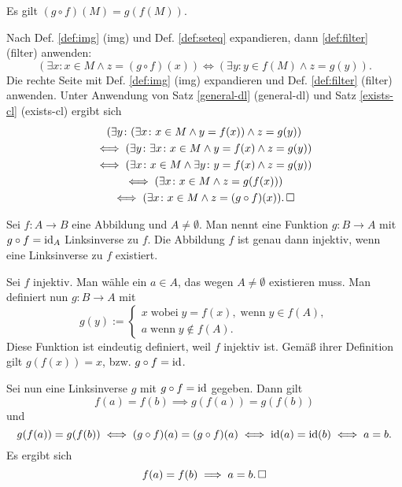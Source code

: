 \begin{Satz}\label{img-chain}
Es gilt $(g\circ f)(M) = g(f(M))$.
\end{Satz}
\begin{Beweis}
Nach Def. \ref{def:img} (img) und Def. \ref{def:seteq} expandieren,
dann \ref{def:filter} (filter) anwenden:%
\[(\exists x\colon x\in M\land z=(g\circ f)(x))
\iff (\exists y\colon y\in f(M)\land z=g(y)).\]
Die rechte Seite mit Def. \ref{def:img} (img) expandieren und
Def. \ref{def:filter} (filter) anwenden. Unter Anwendung von
Satz \ref{general-dl} (general-dl) und Satz \ref{exists-cl} (exists-cl)
ergibt sich%
\begin{gather*}
(\exists y\colon (\exists x\colon x\in M\land y=f(x))\land z=g(y))\\
\iff (\exists y\colon\exists x\colon x\in M\land y=f(x)\land z=g(y))\\
\iff (\exists x\colon x\in M\land\exists y\colon y=f(x)\land z=g(y))\\
\iff (\exists x\colon x\in M\land z=g(f(x)))\\
\iff (\exists x\colon x\in M\land z=(g\circ f)(x)).\,\square
\end{gather*}
\end{Beweis}

\begin{Satz}\label{left-inverse}
Sei $f\colon A\to B$ eine Abbildung und $A\ne\emptyset$. Man nennt
eine Funktion $g\colon B\to A$ mit $g\circ f=\operatorname{id}_A$ Linksinverse
zu $f$. Die Abbildung $f$ ist genau dann injektiv, wenn eine
Linksinverse zu $f$ existiert.
\end{Satz}
\begin{Beweis}
Sei $f$ injektiv. Man wähle ein $a\in A$, das wegen $A\ne\emptyset$
existieren muss. Man definiert nun $g\colon B\to A$ mit%
\[g(y):=\begin{cases}
x\;\text{wobei}\;y=f(x),\;\text{wenn}\;y\in f(A),\\
a\;\text{wenn}\;y\notin f(A).
\end{cases}\]
Diese Funktion ist eindeutig definiert, weil $f$ injektiv ist.
Gemäß ihrer Definition gilt $g(f(x))=x$, bzw. $g\circ f = \operatorname{id}$.

Sei nun eine Linksinverse $g$ mit $g\circ f=\operatorname{id}$ gegeben. Dann gilt
\[f(a)=f(b) \implies g(f(a))=g(f(b))\]
und
\[g(f(a))=g(f(b))
\iff (g\circ f)(a)=(g\circ f)(a)
\iff \operatorname{id}(a)=\operatorname{id}(b)
\iff a=b.\]
Es ergibt sich
\[f(a)=f(b)\implies a=b.\,\square\]
\end{Beweis}

